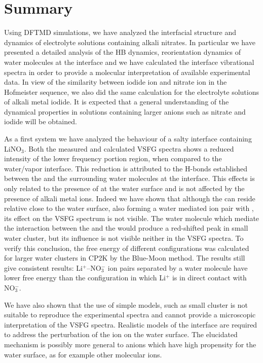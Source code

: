 \chapter{Summary}\label{CHAPTER_Summary}
Using DFTMD simulations, we have analyzed the interfacial structure and dynamics of electrolyte solutions containing alkali nitrates.
In particular we have presented a detailed analysis of the HB dynamics, reorientation dynamics of water molecules at the interface 
and we have calculated the interface vibrational spectra in order to provide a molecular interpretation of available experimental data. 
In view of the similarity between iodide ion and nitrate ion in the Hofmeister sequence, 
we also did the same calculation for the electrolyte solutions of alkali metal iodide. 
It is expected that a general understanding of the dynamical properties in solutions containing larger anions such as 
nitrate and iodide will be obtained.

As a first system we have analyzed the behaviour of a salty interface containing LiNO$_3$.
Both the measured and calculated VSFG spectra shows a reduced intensity of the lower frequency portion region, 
when compared to the water/vapor interface. 
This reduction is attributed to the H-bonds established between the \nitrate and the surrounding water molecules at the interface.
This effects is only related to the presence of \nitrate at the water surface and is not affected by the presence of alkali metal ions.
Indeed we have shown that although the \Li can reside relative close to the water surface, also forming a water mediated
ion pair with \nit, its effect on the VSFG spectrum is not visible. The water molecule which mediate the interaction 
between the \nitrate and the \Li would produce a red-shifted peak in small water cluster, but its influence is not visible 
neither in the VSFG spectra. To verify this conclusion, the free energy of different configurations was calculated for 
larger water clusters in CP2K by the Blue-Moon method. The results still give consistent results: Li$^+$--NO$_3^-$ ion pairs 
separated by a water molecule have lower free energy than the configuration in which Li$^+$ is in direct contact with NO$_3^-$. 

We have also shown that the use of simple models, such as small cluster is not suitable to reproduce the experimental spectra 
and cannot provide a microscopic interpretation of the VSFG spectra. Realistic models of the interface are required to address the 
perturbation of the ion on the water surface. The elucidated mechanism is possibly more general to anions which have high 
propensity for the water surface, as for example other molecular ions.


